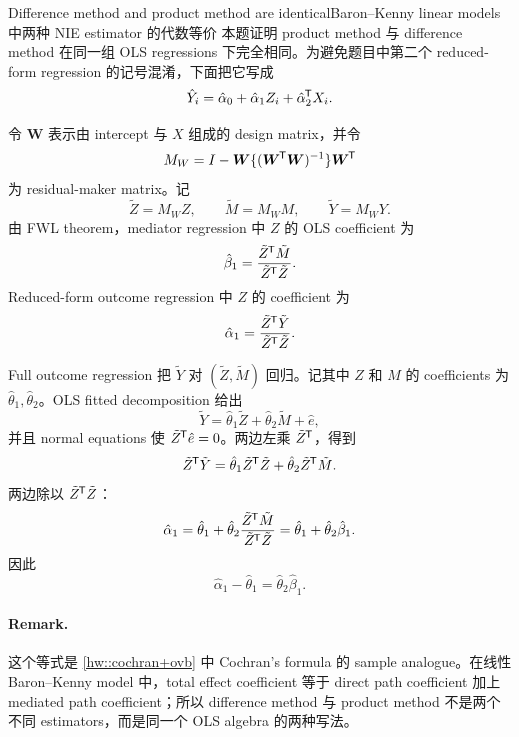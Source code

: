 \begin{exercisesolution}{Difference method and product method are identical}{Baron--Kenny linear models 中两种 NIE estimator 的代数等价}
本题证明 product method 与 difference method 在同一组 OLS regressions 下完全相同。为避免题目中第二个 reduced-form regression 的记号混淆，下面把它写成
\[
\hat Y_i=\hat\alpha_0+\hat\alpha_1 Z_i+\hat\alpha_2^{\mkern-1.5mu\mathsf{T}} X_i.
\]

令 $\boldsymbol{W}$ 表示由 intercept 与 $X$ 组成的 design matrix，并令
\[
M_W=I-\boldsymbol{W}\{(\boldsymbol{W}^{\mkern-1.5mu\mathsf{T}}\boldsymbol{W})^{-1}\}\boldsymbol{W}^{\mkern-1.5mu\mathsf{T}}
\]
为 residual-maker matrix。记
\[
\tilde Z=M_W Z,\qquad \tilde M=M_W M,\qquad \tilde Y=M_W Y.
\]
由 FWL theorem，mediator regression 中 $Z$ 的 OLS coefficient 为
\[
\hat\beta_1=\frac{\tilde Z^{\mkern-1.5mu\mathsf{T}}\tilde M}{\tilde Z^{\mkern-1.5mu\mathsf{T}}\tilde Z}.
\]
Reduced-form outcome regression 中 $Z$ 的 coefficient 为
\[
\hat\alpha_1=\frac{\tilde Z^{\mkern-1.5mu\mathsf{T}}\tilde Y}{\tilde Z^{\mkern-1.5mu\mathsf{T}}\tilde Z}.
\]

Full outcome regression 把 $\tilde Y$ 对 $(\tilde Z,\tilde M)$ 回归。记其中 $Z$ 和 $M$ 的 coefficients 为 $\hat\theta_1,\hat\theta_2$。OLS fitted decomposition 给出
\[
\tilde Y=\hat\theta_1\tilde Z+\hat\theta_2\tilde M+\hat e,
\]
并且 normal equations 使 $\tilde Z^{\mkern-1.5mu\mathsf{T}}\hat e=0$。两边左乘 $\tilde Z^{\mkern-1.5mu\mathsf{T}}$，得到
\[
\tilde Z^{\mkern-1.5mu\mathsf{T}}\tilde Y
=
\hat\theta_1\tilde Z^{\mkern-1.5mu\mathsf{T}}\tilde Z
+\hat\theta_2\tilde Z^{\mkern-1.5mu\mathsf{T}}\tilde M.
\]
两边除以 $\tilde Z^{\mkern-1.5mu\mathsf{T}}\tilde Z$：
\[
\hat\alpha_1
=
\hat\theta_1+\hat\theta_2
\frac{\tilde Z^{\mkern-1.5mu\mathsf{T}}\tilde M}{\tilde Z^{\mkern-1.5mu\mathsf{T}}\tilde Z}
=
\hat\theta_1+\hat\theta_2\hat\beta_1.
\]
因此
\[
\hat\alpha_1-\hat\theta_1=\hat\theta_2\hat\beta_1.
\]

\paragraph{Remark.}
这个等式是 \cref{hw::cochran+ovb} 中 Cochran's formula 的 sample analogue。在线性 Baron--Kenny model 中，total effect coefficient 等于 direct path coefficient 加上 mediated path coefficient；所以 difference method 与 product method 不是两个不同 estimators，而是同一个 OLS algebra 的两种写法。
\end{exercisesolution}

